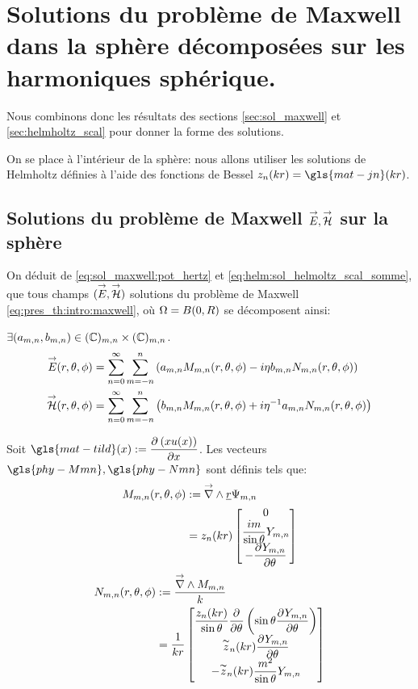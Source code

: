 \section{Solutions du problème de Maxwell dans la sphère décomposées sur les harmoniques sphérique.}\label{sec:maxwell_harmonique}

Nous combinons donc les résultats des sections \ref{sec:sol_maxwell} et \ref{sec:helmholtz_scal} pour donner la forme des solutions.

On se place à l'intérieur de la sphère: nous allons utiliser les solutions de Helmholtz définies à l'aide des fonctions de Bessel $z_n(kr) = \gls{mat-jn}(kr)$.



\subsection{Solutions du problème de Maxwell ${\overset{\rightarrow}{E}},{\overset{\rightarrow}{\mathcal{H}}}$ sur la sphère}
On déduit de  \eqref{eq:sol_maxwell:pot_hertz} et \eqref{eq:helm:sol_helmoltz_scal_somme}, que tous champs $({\overset{\rightarrow}{E}},{\overset{\rightarrow}{\mathcal{H}}})$ solutions du problème de Maxwell \eqref{eq:pres_th:intro:maxwell}, où $\Omega = B(0,R)$ se décomposent ainsi:

$\exists (a_{m,n},b_{m,n}) \in (\mathbb C)_{m,n}\times (\mathbb C)_{m,n}$.
\begin{align*}
  {\overset{\rightarrow}{E}}(r,\theta,\phi) &= \sum\limits_{n=0}^\infty\sum\limits_{m=-n}^n\left( a_{m,n}   M_{m,n}(r,\theta,\phi) - i \eta b_{m,n} N_{m,n}(r,\theta,\phi)\right)\\
  {\overset{\rightarrow}{\mathcal{H}}}(r,\theta,\phi) &= \sum\limits_{n=0}^\infty\sum\limits_{m=-n}^n\left( b_{m,n}   M_{m,n}(r,\theta,\phi) + i {\eta}^{-1} a_{m,n} N_{m,n}(r,\theta,\phi)\right)
\end{align*}

Soit $\gls{mat-tild}(x) := \ddr{x}{\left(xu(x)\right)}$. Les vecteurs $\gls{phy-Mmn} ,\gls{phy-Nmn}$ sont définis tels que:
\begin{align}
 \label{eq:defMmn}
  M_{m,n}(r,\theta,\phi) &:= {\overset{\rightarrow}{\nabla}}\wedge \underline{r} \Psi_{m,n} \\
  &= z_n(kr)
  \begin{bmatrix}
    0 \\ \dfrac{im}{\sin\theta}Y_{m,n}\\ 
    - \dfrac{\partial^{{}} Y_{m,n}}{{\partial \theta}^{{}}}
  \end{bmatrix}
\end{align}
\begin{align}
\label{eq:defNmn}
  N_{m,n}(r,\theta,\phi) &:= \dfrac{{\overset{\rightarrow}{\nabla}}\wedge M_{m,n}}{k} \\
  &= \dfrac{1}{kr}\begin{bmatrix}
    \dfrac{z_n(kr)}{\sin\theta}\dfrac{\partial^{{}} }{{\partial \theta}^{{}}}\left(\sin\theta\dfrac{\partial^{{}} Y_{m,n}}{{\partial \theta}^{{}}}\right)\\ 
    \overset{\thicksim}{z}_n(kr)\dfrac{\partial^{{}} Y_{m,n}}{{\partial \theta}^{{}}}\\ 
    -\overset{\thicksim}{z}_n(kr)\dfrac{m^2}{\sin\theta}Y_{m,n}\\
  \end{bmatrix} 
\end{align}


